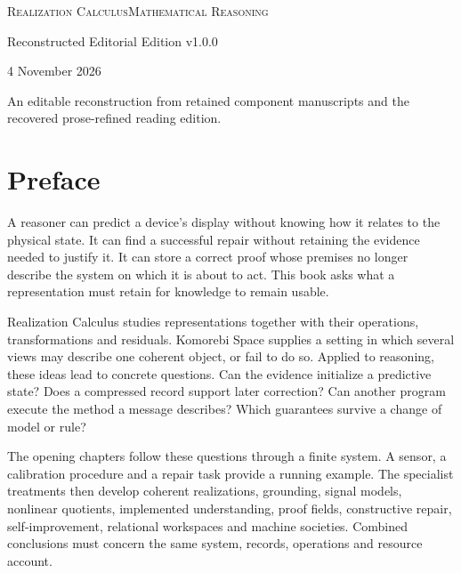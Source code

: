 \documentclass[11pt,oneside,openany]{book}
\numberwithin{equation}{section}
\begin{document}
\frontmatter
\hypersetup{pageanchor=false}
\begin{titlepage}\thispagestyle{empty}
{\small\scshape Realization Calculus\hfill Mathematical Reasoning}\par
{}
\vspace{.3in}{\Large Representation, Inference, Discovery, and Self-Correction\par}
\vspace{.4in}{\color{Accent}\rule{1.9in}{2pt}}\par
\vspace{.4in}{\Large Komorebi P.\par}\vfill
{\Large Reconstructed Editorial Edition v1.0.0\par}\medskip
{4 November 2026\par}\medskip
{\small An editable reconstruction from retained component manuscripts and the recovered prose-refined reading edition.}\par
\end{titlepage}
\hypersetup{pageanchor=true}
\chapter{Preface}
A reasoner can predict a device's display without knowing how it relates to the physical state. It can find a successful repair without retaining the evidence needed to justify it. It can store a correct proof whose premises no longer describe the system on which it is about to act. This book asks what a representation must retain for knowledge to remain usable.

Realization Calculus studies representations together with their operations, transformations and residuals. Komorebi Space supplies a setting in which several views may describe one coherent object, or fail to do so. Applied to reasoning, these ideas lead to concrete questions. Can the evidence initialize a predictive state? Does a compressed record support later correction? Can another program execute the method a message describes? Which guarantees survive a change of model or rule?

The opening chapters follow these questions through a finite system. A sensor, a calibration procedure and a repair task provide a running example. The specialist treatments then develop coherent realizations, grounding, signal models, nonlinear quotients, implemented understanding, proof fields, constructive repair, self-improvement, relational workspaces and machine societies. Combined conclusions must concern the same system, records, operations and resource account.
\end{document}
